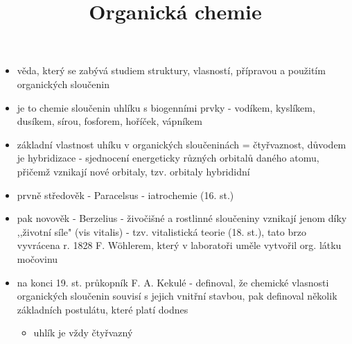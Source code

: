 \documentclass{article}
\title{\vspace{-2cm}Organická chemie\vspace{-1.7cm}}
\date{}
\author{}
\begin{document}
\maketitle

\begin{itemize}
  \item věda, který se zabývá studiem struktury, vlasností, přípravou a použitím organických sloučenin
  \item je to chemie sloučenin uhlíku s biogenními prvky - vodíkem, kyslíkem, dusíkem, sírou, fosforem, hoříček, vápníkem
  \item základní vlastnost uhíku v organických sloučeninách = čtyřvaznost, důvodem je hybridizace - sjednocení energeticky různých orbitalů daného atomu, přičemž vznikají nové orbitaly, tzv. orbitaly hybrididní
  \item prvně středověk - Paracelsus - iatrochemie (16. st.)
  \item pak novověk - Berzelius - živočišné a rostlinné sloučeniny vznikají jenom díky ,,životní síle" (vis vitalis) - tzv. vitalistická teorie (18. st.), tato brzo vyvrácena r. 1828 F. Wöhlerem, který v laboratoři uměle vytvořil org. látku močovinu
  \item na konci 19. st. průkopník F. A. Kekulé - definoval, že chemické vlasnosti organických sloučenin souvisí s jejich vnitřní stavbou, pak definoval několik základních postulátu, které platí dodnes
  \begin{itemize}
    \item uhlík je vždy čtyřvazný
  \end{itemize}
\end{itemize}
\end{document}
